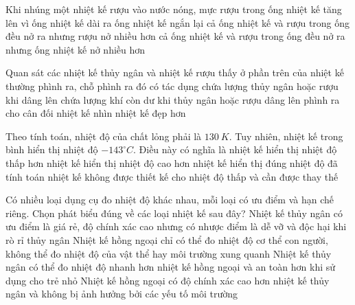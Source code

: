 \begin{ex} 
	Khi nhúng một nhiệt kế rượu vào nước nóng, mực rượu trong ống nhiệt kế tăng lên vì
	\choice
	{ống nhiệt kế dài ra}
	{ống nhiệt kế ngắn lại}
	{\True cả ống nhiệt kế và rượu trong ống đều nở ra nhưng rượu nở nhiều hơn}
	{cả ống nhiệt kế và rượu trong ống đều nở ra nhưng ống nhiệt kế nở nhiều hơn}
\end{ex}


\begin{ex} 
	Quan sát các nhiệt kế thủy ngân và nhiệt kế rượu thấy ở phần trên của nhiệt kế thường phình ra, chỗ phình ra đó có tác dụng
	\choice
	{chứa lượng thủy ngân hoặc rượu khi dâng lên}
	{\True chứa lượng khí còn dư khi thủy ngân hoặc rượu dâng lên}
	{phình ra cho cân đối nhiệt kế}
	{nhìn nhiệt kế đẹp hơn}
	
\end{ex}

\begin{ex} 
	Theo tính toán, nhiệt độ của chất lỏng phải là $130 \ K$. Tuy nhiên, nhiệt kế trong bình hiển thị nhiệt độ $-143^\circ C$. Điều này có nghĩa là
	\choice
	{nhiệt kế hiển thị nhiệt độ thấp hơn}
	{nhiệt kế hiển thị nhiệt độ cao hơn}
	{\True nhiệt kế hiển thị đúng nhiệt độ đã tính toán}
	{nhiệt kế không được thiết kế cho nhiệt độ thấp và cần được thay thế}
	
\end{ex}



\begin{ex} 
	Có nhiều loại dụng cụ đo nhiệt độ khác nhau, mỗi loại có ưu điểm và hạn chế riêng. Chọn phát biểu đúng về các loại nhiệt kế sau đây?
	\choice
	{\True Nhiệt kế thủy ngân có ưu điểm là giá rẻ, độ chính xác cao nhưng có nhược điểm là dễ vỡ và độc hại khi rò rỉ thủy ngân}
	{Nhiệt kế hồng ngoại chỉ có thể đo nhiệt độ cơ thể con người, không thể đo nhiệt độ của vật thể hay môi trường xung quanh}
	{Nhiệt kế thủy ngân có thể đo nhiệt độ nhanh hơn nhiệt kế hồng ngoại và an toàn hơn khi sử dụng cho trẻ nhỏ}
	{Nhiệt kế hồng ngoại có độ chính xác cao hơn nhiệt kế thủy ngân và không bị ảnh hưởng bởi các yếu tố môi trường}
\end{ex}



